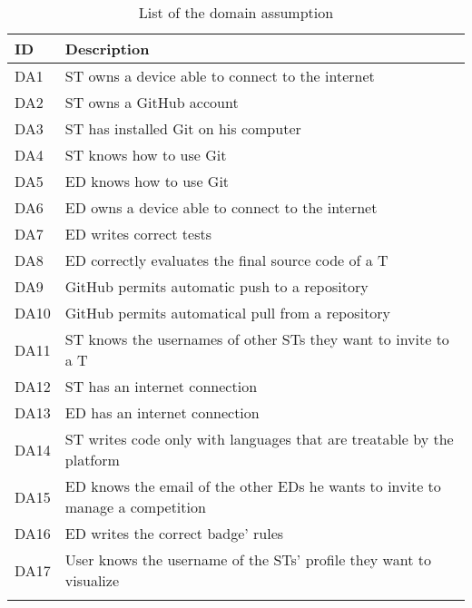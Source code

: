 \begin{longtable}{|l|l|}
  \hline
  \textbf{ID} & \textbf{Description}      \\
  \hline
  DA1 & ST owns a device able to connect to the internet \\
  \hline
  DA2 & ST owns a GitHub account \\
  \hline
  DA3 & ST has installed Git on his computer \\
  \hline
  DA4 & ST knows how to use Git \\
  \hline
  DA5 & ED knows how to use Git \\
  \hline
  DA6 & ED owns a device able to connect to the internet \\
  \hline
  DA7 & ED writes correct tests \\ 
  \hline
  DA8 & ED correctly evaluates the final source code of a T \\
  \hline
  DA9 & GitHub permits automatic push to a repository \\
  \hline
  DA10 & GitHub permits automatical pull from a repository \\
  \hline
  DA11 & ST knows the usernames of other STs they want to invite to a T  \\
  \hline
  DA12 & ST has an internet connection \\
  \hline
  DA13 & ED has an internet connection \\
  \hline
  DA14 & ST writes code only with languages that are treatable by the platform \\
  \hline
  DA15 & ED knows the email of the other EDs he wants to invite to manage a competition \\
  \hline
  DA16 & ED writes the correct badge’ rules \\
  \hline
  DA17 & User knows the username of the STs' profile they want to visualize \\
  \hline
  \caption{List of the domain assumption}
  \label{tab:domainAssumption}
\end{longtable}